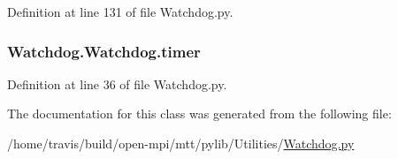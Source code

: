 Definition at line 131 of file Watchdog.\-py.

\hypertarget{class_watchdog_1_1_watchdog_ae03efeba550ed8039ab79a8414b8be82}{
\subsubsection[{timer}]{\setlength{\rightskip}{0pt plus 5cm}Watchdog.\-Watchdog.\-timer}}\label{class_watchdog_1_1_watchdog_ae03efeba550ed8039ab79a8414b8be82}


Definition at line 36 of file Watchdog.\-py.



The documentation for this class was generated from the following file\-:\begin{DoxyCompactItemize}
\item 
/home/travis/build/open-\/mpi/mtt/pylib/\-Utilities/\hyperlink{_watchdog_8py}{Watchdog.\-py}\end{DoxyCompactItemize}
